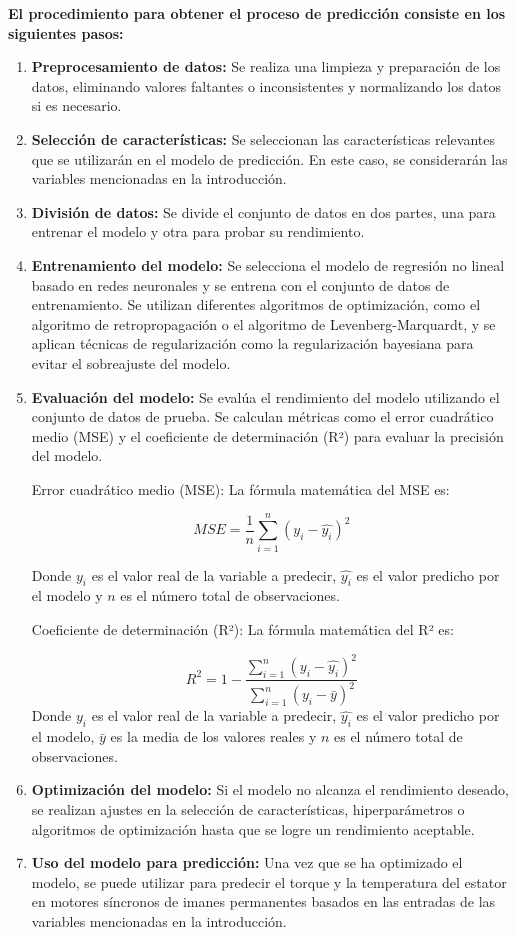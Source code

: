 \documentclass{article}
\begin{document}
\textbf{El procedimiento para obtener el proceso de predicción consiste en los siguientes pasos:}

\begin{enumerate}
\item \textbf{Preprocesamiento de datos:} Se realiza una limpieza y preparación de los datos, eliminando valores faltantes o inconsistentes y normalizando los datos si es necesario.
\item \textbf{Selección de características:} Se seleccionan las características relevantes que se utilizarán en el modelo de predicción. En este caso, se considerarán las variables mencionadas en la introducción.
\item \textbf{División de datos:} Se divide el conjunto de datos en dos partes, una para entrenar el modelo y otra para probar su rendimiento.
\item \textbf{Entrenamiento del modelo:} Se selecciona el modelo de regresión no lineal basado en redes neuronales y se entrena con el conjunto de datos de entrenamiento. Se utilizan diferentes algoritmos de optimización, como el algoritmo de retropropagación o el algoritmo de Levenberg-Marquardt, y se aplican técnicas de regularización como la regularización bayesiana para evitar el sobreajuste del modelo.
\item \textbf{Evaluación del modelo:} Se evalúa el rendimiento del modelo utilizando el conjunto de datos de prueba. Se calculan métricas como el error cuadrático medio (MSE) y el coeficiente de determinación (R²) para evaluar la precisión del modelo.

Error cuadrático medio (MSE):
La fórmula matemática del MSE es:

$$MSE = \frac{1}{n} \sum_{i=1}^{n}(y_i - \hat{y_i})^2$$

Donde $y_i$ es el valor real de la variable a predecir, $\hat{y_i}$ es el valor predicho por el modelo y $n$ es el número total de observaciones.

Coeficiente de determinación (R²):
La fórmula matemática del R² es:

$$R^2 = 1 - \frac{\sum_{i=1}^{n}(y_i - \hat{y_i})^2}{\sum_{i=1}^{n}(y_i - \bar{y})^2}$$
Donde $y_i$ es el valor real de la variable a predecir, $\hat{y_i}$ es el valor predicho por el modelo, $\bar{y}$ es la media de los valores reales y $n$ es el número total de observaciones.


\item \textbf{Optimización del modelo:} Si el modelo no alcanza el rendimiento deseado, se realizan ajustes en la selección de características, hiperparámetros o algoritmos de optimización hasta que se logre un rendimiento aceptable.
\item \textbf{Uso del modelo para predicción:} Una vez que se ha optimizado el modelo, se puede utilizar para predecir el torque y la temperatura del estator en motores síncronos de imanes permanentes basados en las entradas de las variables mencionadas en la introducción.
\end{enumerate}
\end{document}

